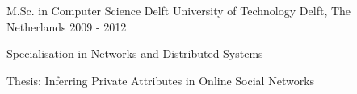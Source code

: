 

\begin{cventries}

  \cventry
    {M.Sc. in Computer Science} %
    {Delft University of Technology} %
    {Delft, The Netherlands} %
    {2009 - 2012} %
    {
      \begin{cvitems} %
        \item {Specialisation in Networks and Distributed Systems}
        \item {Thesis: Inferring Private Attributes in Online Social Networks}
      \end{cvitems}
    }


\end{cventries}
